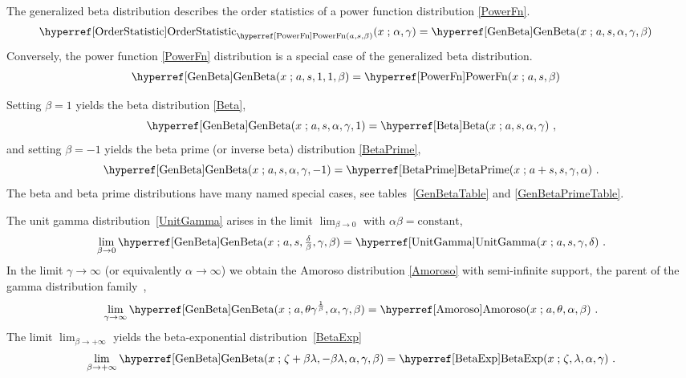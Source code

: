 
The generalized beta distribution describes the order statistics of a power function  distribution \eqref{PowerFn}.
\begin{align*}
\opr{OrderStatistic}_{\opr{PowerFn}(a,s,\beta)} &(x \given \alpha, \gamma) = \opr{GenBeta}(x\given a, s, \alpha,\gamma, \beta) 
\checked
\end{align*}
Conversely, the power function \eqref{PowerFn} distribution is a special case of the generalized beta distribution. 
\begin{align*}
\opr{GenBeta}(x\given a, s, 1, 1,\beta) & = \opr{PowerFn}(x\given a,s,\beta)  \checked
\notag
\end{align*}

Setting $\beta=1$ yields the beta  distribution \eqref{Beta}, 
\[
\opr{GenBeta}(x\given a,s,\alpha, \gamma,1) = \opr{Beta}(x\given a,s,\alpha,\gamma) \ , \checked
\notag
\]
and setting $\beta=-1$ yields the beta prime (or inverse beta) distribution \eqref{BetaPrime},  
\[
\opr{GenBeta}(x\given a,s,\alpha, \gamma,-1) = \opr{BetaPrime}(x\given a+s,s,\gamma,\alpha) \ . \checked
\notag
\]
The beta  and beta prime  distributions have many named special cases, see tables~\ref{GenBetaTable} and \ref{GenBetaPrimeTable}.


The unit gamma distribution~\eqref{UnitGamma} arises in the limit $\lim_{\beta\rightarrow0}$ with $\alpha\beta=\text{constant}$,
\[
 \lim_{\beta\rightarrow0 } \opr{GenBeta}(x\given a,s,\tfrac{\delta}{\beta}, \gamma,\beta)  = \opr{UnitGamma}(x\given a, s, \gamma,\delta) \ . \checked
 \notag
\]
In the  limit $\gamma\rightarrow\infty$ (or equivalently $\alpha\rightarrow\infty$) we obtain the Amoroso distribution \eqref{Amoroso} with semi-infinite support, the parent of the gamma distribution family~\cite{McDonald1984},
\[
\lim_{\gamma\rightarrow\infty} \opr{GenBeta}(x\given a, \theta \gamma^{\frac{1}{\beta}} ,\alpha, \gamma, \beta ) = \opr{Amoroso}(x\given a,\theta,\alpha, \beta) \ . \checked
\notag
\]
The limit  $\lim_{\beta\rightarrow+\infty }$ yields the beta-exponential distribution~\eqref{BetaExp}
\[
 \lim_{\beta\rightarrow+\infty } \opr{GenBeta}(x\given \pLoc+\beta\lambda,-\beta\pScale,\alpha,\gamma,\beta) = \opr{BetaExp}(x\given \pLoc,\pScale,\alpha, \gamma) \checked
\ .
\notag
\]




